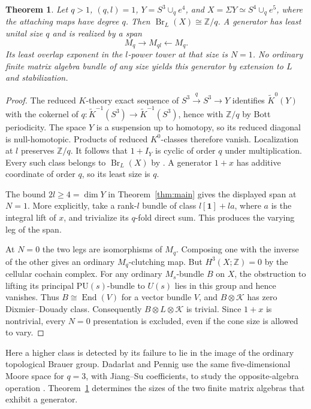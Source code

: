 \documentclass[11pt]{article}
\newtheorem{theorem}{Theorem}[section]
\DeclareMathOperator{\End}{End}
\DeclareMathOperator{\Br}{Br}
\newcommand{\K}{\mathcal K}
\newcommand{\Z}{\mathbb Z}
\newcommand{\triv}{\mathbf 1}
\newcommand{\IY}{I_Y}
\begin{document}
\begin{theorem}\label{thm:moore}
Let \(q>1\), \((q,l)=1\), \(Y=S^3\cup_q e^4\), and \(X=\Sigma Y\simeq S^4\cup_q e^5\), where the attaching maps have degree \(q\). Then \(\Br_L(X)\cong\Z/q\). A generator has least unital size \(q\) and is realized by a span
\[
                M_q\longrightarrow M_{ql}\longleftarrow M_q .
\]
Its least overlap exponent in the \(l\)-power tower at that size is \(N=1\). No ordinary finite matrix algebra bundle of any size yields this generator by extension to \(L\) and stabilization.
\end{theorem}
\begin{proof}
The reduced \(K\)-theory exact sequence of \(S^3\xrightarrow{q}S^3\to Y\) identifies \(\widetilde K^0(Y)\) with the cokernel of \(q:\widetilde K^{-1}(S^3)\to\widetilde K^{-1}(S^3)\), hence with \(\Z/q\) by Bott periodicity. The space \(Y\) is a suspension up to homotopy, so its reduced diagonal is null-homotopic. Products of reduced \(K^0\)-classes therefore vanish. Localization at \(l\) preserves \(\Z/q\). It follows that \(1+\IY\) is cyclic of order \(q\) under multiplication. Every such class belongs to \(\Br_L(X)\) by \cite[Theorem~2.15(ii)]{DP2}. A generator \(1+x\) has additive coordinate of order \(q\), so its least size is \(q\).

The bound \(2l\geq4=\dim Y\) in Theorem~\ref{thm:main} gives the displayed span at \(N=1\). More explicitly, take a rank-\(l\) bundle of class \(l[\triv]+l a\), where \(a\) is the integral lift of \(x\), and trivialize its \(q\)-fold direct sum. This produces the varying leg of the span.

At \(N=0\) the two legs are isomorphisms of \(M_q\). Composing one with the inverse of the other gives an ordinary \(M_q\)-clutching map. But \(H^3(X;\Z)=0\) by the cellular cochain complex. For any ordinary \(M_s\)-bundle \(B\) on \(X\), the obstruction to lifting its principal \(\mathrm{PU}(s)\)-bundle to \(U(s)\) lies in this group and hence vanishes. Thus \(B\cong\End(V)\) for a vector bundle \(V\), and \(B\otimes\K\) has zero Dixmier--Douady class. Consequently \(B\otimes L\otimes\K\) is trivial. Since \(1+x\) is nontrivial, every \(N=0\) presentation is excluded, even if the cone size is allowed to vary.
\end{proof}

Here a higher class is detected by its failure to lie in the image of the ordinary topological Brauer group. Dadarlat and Pennig use the same five-dimensional Moore space for \(q=3\), with Jiang--Su coefficients, to study the opposite-algebra operation \cite[Example 3.5]{DP2}. Theorem~\ref{thm:moore} determines the sizes of the two finite matrix algebras that exhibit a generator.
\end{document}
